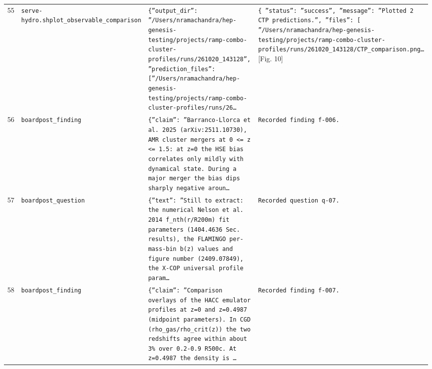 \documentclass[11pt,a4paper]{article}
\begin{document}
\begin{longtable}{@{}p{}p{}p{}p{}@{}}
55 & \texttt{serve-hydro.sh}\newline\texttt{plot\_\allowbreak{}observable\_\allowbreak{}comparison} & \texttt{\{''output\_\allowbreak{}dir'':\allowbreak{} ''/\allowbreak{}Users/\allowbreak{}nramachandra/\allowbreak{}hep-genesis-testing/\allowbreak{}projects/\allowbreak{}ramp-combo-cluster-profiles/\allowbreak{}runs/\allowbreak{}261020\_\allowbreak{}143128'',\allowbreak{} ''prediction\_\allowbreak{}files'':\allowbreak{} [''/\allowbreak{}Users/\allowbreak{}nramachandra/\allowbreak{}hep-genesis-testing/\allowbreak{}projects/\allowbreak{}ramp-combo-cluster-profiles/\allowbreak{}runs/\allowbreak{}26\ldots{}\allowbreak{}} & \texttt{\{   ''status'':\allowbreak{} ''success'',\allowbreak{}   ''message'':\allowbreak{} ''Plotted 2 CTP predictions.'',\allowbreak{}   ''files'':\allowbreak{} [     ''/\allowbreak{}Users/\allowbreak{}nramachandra/\allowbreak{}hep-genesis-testing/\allowbreak{}projects/\allowbreak{}ramp-combo-cluster-profiles/\allowbreak{}runs/\allowbreak{}261020\_\allowbreak{}143128/\allowbreak{}CTP\_\allowbreak{}comparison.png\ldots{}\allowbreak{}} [Fig. 10] \\
56 & \texttt{board}\newline\texttt{post\_\allowbreak{}finding} & \texttt{\{''claim'':\allowbreak{} ''Barranco-Llorca et al. 2025 (arXiv:\allowbreak{}2511.10730)\allowbreak{},\allowbreak{} AMR cluster mergers at 0 \textless{}\allowbreak{}=\allowbreak{} z \textless{}\allowbreak{}=\allowbreak{} 1.5:\allowbreak{} at z=\allowbreak{}0 the HSE bias correlates only mildly with dynamical state. During a major merger the bias dips sharply negative aroun\ldots{}\allowbreak{}} & \texttt{Recorded finding f-006.} \\
57 & \texttt{board}\newline\texttt{post\_\allowbreak{}question} & \texttt{\{''text'':\allowbreak{} ''Still to extract:\allowbreak{} the numerical Nelson et al. 2014 f\_\allowbreak{}nth(r/\allowbreak{}R200m)\allowbreak{} fit parameters (1404.4636 Sec. results)\allowbreak{},\allowbreak{} the FLAMINGO per-mass-bin b(z)\allowbreak{} values and figure number (2409.07849)\allowbreak{},\allowbreak{} the X-COP universal profile param\ldots{}\allowbreak{}} & \texttt{Recorded question q-07.} \\
58 & \texttt{board}\newline\texttt{post\_\allowbreak{}finding} & \texttt{\{''claim'':\allowbreak{} ''Comparison overlays of the HACC emulator profiles at z=\allowbreak{}0 and z=\allowbreak{}0.4987 (midpoint parameters)\allowbreak{}. In CGD (rho\_\allowbreak{}gas/\allowbreak{}rho\_\allowbreak{}crit(z)\allowbreak{})\allowbreak{} the two redshifts agree within about 3\% over 0.2-0.9 R500c. At z=\allowbreak{}0.4987 the density is \ldots{}\allowbreak{}} & \texttt{Recorded finding f-007.} \\

\end{longtable}
\end{document}
